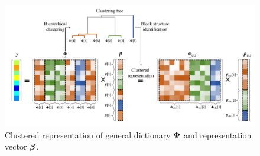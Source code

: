 \begin{figure}[!b]
\centering
\includegraphics[width=1\textwidth,keepaspectratio]{images/Clustered_Representation.png} %
\centering
\caption{Clustered representation of general dictionary $\boldsymbol{\Phi}$ and representation vector $\boldsymbol{\beta}$.}
\label{fig:Clustered_Representation}
\end{figure}